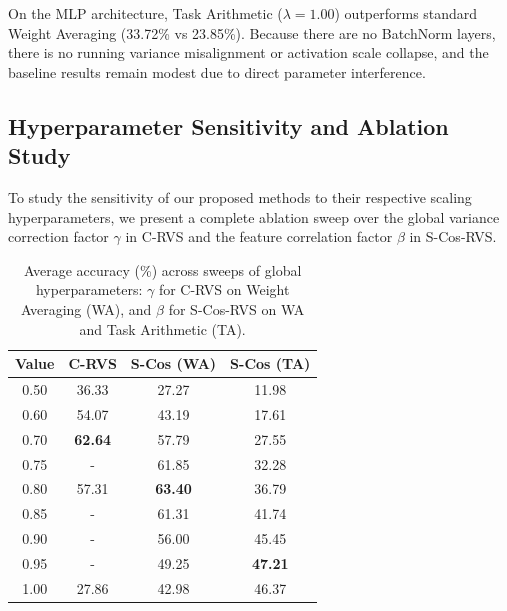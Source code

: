 \documentclass{article}
\theoremstyle{plain}
\theoremstyle{definition}
\theoremstyle{remark}
\begin{document}
On the MLP architecture, Task Arithmetic ($\lambda=1.00$) outperforms standard Weight Averaging (33.72\% vs 23.85\%). Because there are no BatchNorm layers, there is no running variance misalignment or activation scale collapse, and the baseline results remain modest due to direct parameter interference.

\subsection{Hyperparameter Sensitivity and Ablation Study}
\label{sec:ablation}

To study the sensitivity of our proposed methods to their respective scaling hyperparameters, we present a complete ablation sweep over the global variance correction factor $\gamma$ in C-RVS and the feature correlation factor $\beta$ in S-Cos-RVS.

\begin{table}[h]
\caption{Average accuracy (\%) across sweeps of global hyperparameters: $\gamma$ for C-RVS on Weight Averaging (WA), and $\beta$ for S-Cos-RVS on WA and Task Arithmetic (TA).}
\label{tab:ablation_sweeps}
\begin{center}
\begin{small}
\begin{sc}
\setlength{\tabcolsep}{4pt}
\begin{tabular}{cccc}
\toprule
Value & C-RVS & S-Cos (WA) & S-Cos (TA) \\
\midrule
0.50 & 36.33 & 27.27 & 11.98 \\
0.60 & 54.07 & 43.19 & 17.61 \\
0.70 & \textbf{62.64} & 57.79 & 27.55 \\
0.75 & - & 61.85 & 32.28 \\
0.80 & 57.31 & \textbf{63.40} & 36.79 \\
0.85 & - & 61.31 & 41.74 \\
0.90 & - & 56.00 & 45.45 \\
0.95 & - & 49.25 & \textbf{47.21} \\
1.00 & 27.86 & 42.98 & 46.37 \\
\bottomrule
\end{tabular}
\end{sc}
\end{small}
\end{center}
\end{table}
\end{document}
